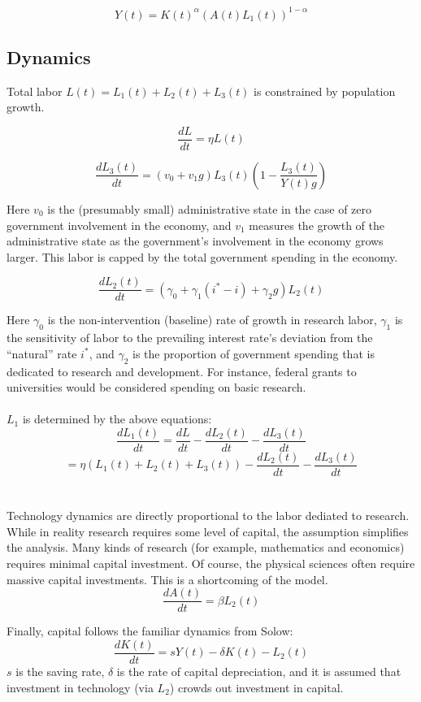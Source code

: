 \documentclass[12pt]{article}
\theoremstyle{definition}
\begin{document}
\[Y(t)=K(t)^\alpha (A(t)L_1(t))^{1-\alpha}\]

\subsection{Dynamics}

Total labor \(L(t)=L_1(t)+L_2(t)+L_3(t)\) is constrained by population growth.

\[\frac{dL}{dt}=\eta L(t)\]

\[\frac{dL_3(t)}{dt}=\left(v_0+v_1g\right)L_3(t)\left(1-\frac{L_3(t)}{Y(t)g}\right) \]

Here \(v_0\) is the (presumably small) administrative state in the case of zero government involvement in the economy, and \(v_1\) measures the growth of the administrative state as the government's involvement in the economy grows larger.  This labor is capped by the total government spending in the economy.

\[\frac{dL_2(t)}{dt}=\left(\gamma_0+\gamma_1 (i^*-i) +\gamma_2 g\right) L_2(t) \]

Here \(\gamma_0\) is the non-intervention (baseline) rate of growth in research labor, \(\gamma_1\) is the sensitivity of labor to the prevailing interest rate's deviation from the ``natural'' rate \(i^*\), and \(\gamma_2\) is the proportion of government spending that is dedicated to research and development.  For instance, federal grants to universities would be considered spending on basic research.   
\\
\\
\(L_1\) is determined by the above equations:
\[\frac{dL_1(t)}{dt}=\frac{dL}{dt}-\frac{dL_2(t)}{dt}-\frac{dL_3(t)}{dt}\] 
\[=\eta\left(L_1(t)+L_2(t)+L_3(t)\right)-\frac{dL_2(t)}{dt}-\frac{dL_3(t)}{dt}\]
\\
\\
Technology dynamics are directly proportional to the labor dediated to research.  While in reality research requires some level of capital, the assumption simplifies the analysis.  Many kinds of research (for example, mathematics and economics) requires minimal capital investment.  Of course, the physical sciences often require massive capital investments.  This is a shortcoming of the model.
\[\frac{dA(t)}{dt}=\beta L_2(t)\]

Finally, capital follows the familiar dynamics from Solow:
\[\frac{dK(t)}{dt}=s Y(t) - \delta K(t)- L_2(t)\]
\(s\) is the saving rate, \(\delta\) is the rate of capital depreciation, and it is assumed that investment in technology (via \(L_2\)) crowds out investment in capital.  
\end{document}
